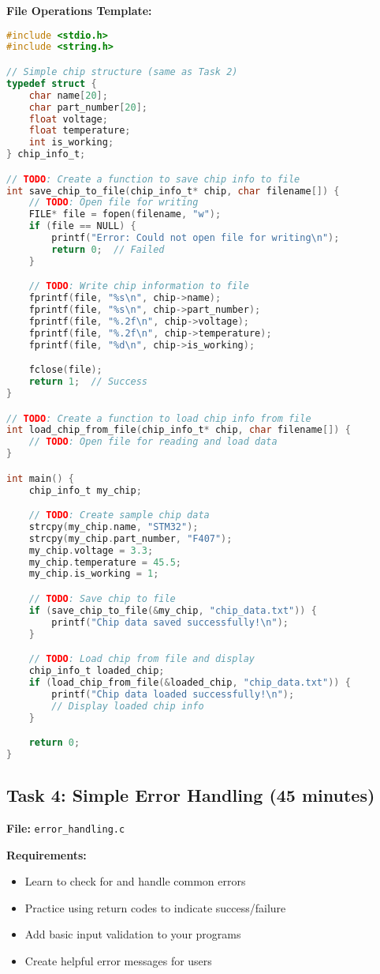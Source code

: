 \documentclass[11pt,a4paper]{article}
\begin{document}
\textbf{File Operations Template:}
\begin{lstlisting}[language=C]
#include <stdio.h>
#include <string.h>

// Simple chip structure (same as Task 2)
typedef struct {
    char name[20];
    char part_number[20];
    float voltage;
    float temperature;
    int is_working;
} chip_info_t;

// TODO: Create a function to save chip info to file
int save_chip_to_file(chip_info_t* chip, char filename[]) {
    // TODO: Open file for writing
    FILE* file = fopen(filename, "w");
    if (file == NULL) {
        printf("Error: Could not open file for writing\n");
        return 0;  // Failed
    }

    // TODO: Write chip information to file
    fprintf(file, "%s\n", chip->name);
    fprintf(file, "%s\n", chip->part_number);
    fprintf(file, "%.2f\n", chip->voltage);
    fprintf(file, "%.2f\n", chip->temperature);
    fprintf(file, "%d\n", chip->is_working);

    fclose(file);
    return 1;  // Success
}

// TODO: Create a function to load chip info from file
int load_chip_from_file(chip_info_t* chip, char filename[]) {
    // TODO: Open file for reading and load data
}

int main() {
    chip_info_t my_chip;

    // TODO: Create sample chip data
    strcpy(my_chip.name, "STM32");
    strcpy(my_chip.part_number, "F407");
    my_chip.voltage = 3.3;
    my_chip.temperature = 45.5;
    my_chip.is_working = 1;

    // TODO: Save chip to file
    if (save_chip_to_file(&my_chip, "chip_data.txt")) {
        printf("Chip data saved successfully!\n");
    }

    // TODO: Load chip from file and display
    chip_info_t loaded_chip;
    if (load_chip_from_file(&loaded_chip, "chip_data.txt")) {
        printf("Chip data loaded successfully!\n");
        // Display loaded chip info
    }

    return 0;
}
\end{lstlisting}

\subsection{Task 4: Simple Error Handling (45 minutes)}

\textbf{File:} \texttt{error\_handling.c}

\textbf{Requirements:}
\begin{itemize}
    \item Learn to check for and handle common errors
    \item Practice using return codes to indicate success/failure
    \item Add basic input validation to your programs
    \item Create helpful error messages for users
\end{itemize}
\end{document}
